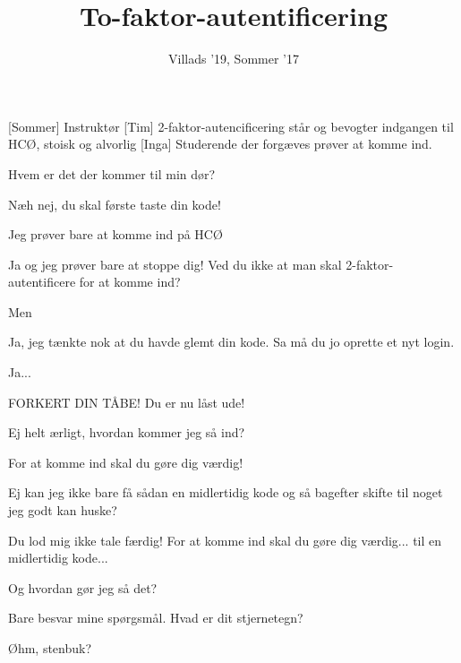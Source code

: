\documentclass[a4paper,11pt]{article}
\title{To-faktor-autentificering}
\author{Villads '19, Sommer '17}
\begin{document}
\maketitle

\begin{roles}
[Sommer] Instruktør
[Tim] 2-faktor-autencificering står og bevogter indgangen til HCØ, stoisk og alvorlig
[Inga] Studerende der forgæves prøver at komme ind.
\end{roles}

\begin{props}
\prop{}
\end{props}


\begin{sketch}


 Hvem er det der kommer til min dør?


 Næh nej, du skal første taste din kode!

 Jeg prøver bare at komme ind på HCØ

 Ja og jeg prøver bare at stoppe dig! Ved du ikke at man skal 2-faktor-autentificere for at komme ind?


 Men


 Ja, jeg tænkte nok at du havde glemt din kode. Sa må du jo oprette et nyt login.

 Ja... 


 FORKERT DIN TÅBE! Du er nu låst ude!

 Ej helt ærligt, hvordan kommer jeg så ind?

 For at komme ind skal du gøre dig værdig!

 Ej kan jeg ikke bare få sådan en midlertidig kode og så bagefter skifte til noget jeg godt kan huske?

 Du lod mig ikke tale færdig! For at komme ind skal du gøre dig værdig... til en midlertidig kode...

 Og hvordan gør jeg så det?

 Bare besvar mine spørgsmål. Hvad er dit stjernetegn?

 Øhm, stenbuk?


\end{sketch}
\end{document}
